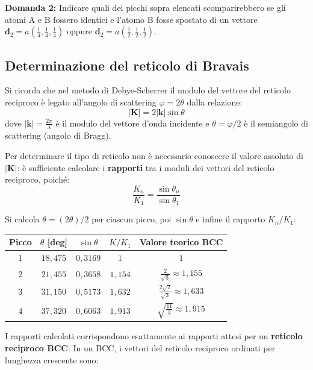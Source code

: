 \textbf{Domanda 2:} Indicare quali dei picchi sopra elencati scomparirebbero se gli atomi A e B fossero identici e l'atomo B fosse spostato di un vettore $\mathbf{d}_2 = a\left(\frac{1}{4}, \frac{1}{4}, \frac{1}{4}\right)$ oppure $\mathbf{d}_2 = a\left(\frac{1}{2}, \frac{1}{2}, \frac{1}{2}\right)$.

\subsection{Determinazione del reticolo di Bravais}

Si ricorda che nel metodo di Debye-Scherrer il modulo del vettore del reticolo reciproco è legato all'angolo di scattering $\varphi = 2\theta$ dalla relazione:
\begin{equation}
|\mathbf{K}| = 2|\mathbf{k}|\sin\theta
\end{equation}
dove $|\mathbf{k}| = \frac{2\pi}{\lambda}$ è il modulo del vettore d'onda incidente e $\theta = \varphi/2$ è il semiangolo di scattering (angolo di Bragg).

Per determinare il tipo di reticolo non è necessario conoscere il valore assoluto di $|\mathbf{K}|$: è sufficiente calcolare i \textbf{rapporti} tra i moduli dei vettori del reticolo reciproco, poiché:
\begin{equation}
\frac{K_n}{K_1} = \frac{\sin\theta_n}{\sin\theta_1}
\end{equation}


Si calcola $\theta = (2\theta)/2$ per ciascun picco, poi $\sin\theta$ e infine il rapporto $K_n/K_1$:

\begin{table}[h!]
\centering
\begin{tabular}{|c|c|c|c|c|}
\hline
Picco & $\theta$ [deg] & $\sin\theta$ & $K/K_1$ & Valore teorico BCC \\ \hline
1 & $18{,}475$ & $0{,}3169$ & $1$ & $1$ \\
2 & $21{,}455$ & $0{,}3658$ & $1{,}154$ & $\frac{2}{\sqrt{3}} \approx 1{,}155$ \\
3 & $31{,}150$ & $0{,}5173$ & $1{,}632$ & $\frac{2\sqrt{2}}{\sqrt{3}} \approx 1{,}633$ \\
4 & $37{,}320$ & $0{,}6063$ & $1{,}913$ & $\sqrt{\frac{11}{3}} \approx 1{,}915$ \\ \hline
\end{tabular}
\end{table}



I rapporti calcolati corrispondono esattamente ai rapporti attesi per un \textbf{reticolo reciproco BCC}. In un BCC, i vettori del reticolo reciproco ordinati per lunghezza crescente sono:

